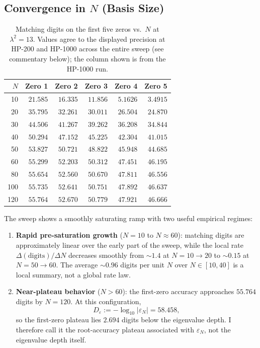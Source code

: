 \documentclass[11pt,a4paper]{article}
\begin{document}
\subsection{\texorpdfstring{Convergence in $N$ (Basis Size)}
{Convergence in N (Basis Size)}}
\label{sec:conv_N_label}

\begin{table}[!htbp]
\centering
\caption{Matching digits on the first five zeros vs.\ $N$ at
$\lambda^2{=}13$. Values agree to the displayed precision at HP-200 and HP-1000 across
the entire sweep (see commentary below); the column shown is from
the HP-1000 run.}
\label{tab:conv_N}
\begin{tabular}{@{}rrrrrr@{}}
\toprule
$N$ & Zero 1 & Zero 2 & Zero 3 & Zero 4 & Zero 5 \\
\midrule
10  & $21.585$ & $16.335$ & $11.856$ & $5.1626$  & $3.4915$ \\
20  & $35.795$ & $32.261$ & $30.011$ & $26.504$ & $24.870$ \\
30  & $44.506$ & $41.267$ & $39.262$ & $36.208$ & $34.844$ \\
40  & $50.294$ & $47.152$ & $45.225$ & $42.304$ & $41.015$ \\
50  & $53.827$ & $50.721$ & $48.822$ & $45.948$ & $44.685$ \\
60  & $55.299$ & $52.203$ & $50.312$ & $47.451$ & $46.195$ \\
80  & $55.654$ & $52.560$ & $50.670$ & $47.811$ & $46.556$ \\
100 & $55.735$ & $52.641$ & $50.751$ & $47.892$ & $46.637$ \\
120 & $55.764$ & $52.670$ & $50.779$ & $47.921$ & $46.666$ \\
\bottomrule
\end{tabular}
\end{table}

The sweep shows a smoothly saturating ramp with two useful empirical
regimes:
\begin{enumerate}
\item \textbf{Rapid pre-saturation growth} ($N=10$ to
$N\approx60$): matching digits are approximately linear over the
early part of the sweep, while the local rate
$\Delta(\text{digits})/\Delta N$ decreases smoothly from
${\sim}1.4$ at $N{=}10{\to}20$ to ${\sim}0.15$ at
$N{=}50{\to}60$. The average ${\sim}0.96$ digits per unit $N$ over
$N\in[10,40]$ is a local summary, not a global rate law.
\item \textbf{Near-plateau behavior} ($N>60$): the first-zero
accuracy approaches $55.764$ digits by $N=120$. At this
configuration,
\[
D_{\varepsilon}:=-\log_{10}|\varepsilon_N|=58.458,
\]
so the first-zero plateau lies $2.694$ digits below the eigenvalue
depth. I therefore call it the root-accuracy plateau associated with
$\varepsilon_N$, not the eigenvalue depth itself.
\end{enumerate}
\end{document}
